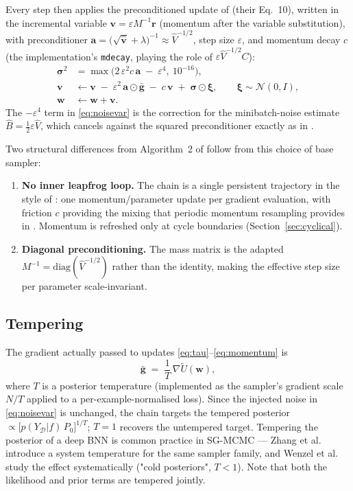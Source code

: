 \documentclass[11pt]{article}
\newcommand{\w}{\mathbf{w}}
\newcommand{\vv}{\mathbf{v}}
\newcommand{\D}{\mathcal{D}}
\newcommand{\N}{\mathcal{N}}
\newcommand{\gbar}{\bar{\mathbf{g}}}
\newcommand{\vhat}{\hat{\mathbf{v}}}
\newcommand{\gradU}{\nabla \widetilde{U}}
\begin{document}
Every step then applies the preconditioned update of
\cite{springenberg2016} (their Eq.~10), written in the incremental variable
$\vv = \varepsilon M^{-1}\mathbf{r}$ (momentum after the variable
substitution), with preconditioner
$\mathbf{a} = \bigl(\sqrt{\vhat} + \lambda\bigr)^{-1} \approx
\hat V^{-1/2}$, step size $\varepsilon$, and momentum decay
$c$ (the implementation's \texttt{mdecay}, playing the role of
$\varepsilon \hat V^{-1/2} C$):
\begin{align}
  \bm{\sigma}^{2} &= \max\bigl(2\,\varepsilon^{2} c\,\mathbf{a}
      \;-\; \varepsilon^{4},\ 10^{-16}\bigr),
      \label{eq:noisevar}\\
  \vv &\leftarrow \vv \;-\; \varepsilon^{2}\,\mathbf{a}\odot\gbar
      \;-\; c\,\vv \;+\; \bm{\sigma}\odot\bm{\xi},
      \qquad \bm{\xi}\sim\N(0,I),
      \label{eq:momentum}\\
  \w &\leftarrow \w + \vv.
  \label{eq:position}
\end{align}
The $-\varepsilon^4$ term in \eqref{eq:noisevar} is the correction for the
minibatch-noise estimate $\hat B = \tfrac{1}{2}\varepsilon\hat V$, which
cancels against the squared preconditioner exactly as in
\cite{springenberg2016}.

Two structural differences from Algorithm~2 of \cite{wu2025} follow from this
choice of base sampler:
\begin{enumerate}
  \item \textbf{No inner leapfrog loop.}  The chain is a single persistent
  trajectory in the style of \cite{chen2014}: one
  momentum/parameter update per gradient evaluation, with friction $c$
  providing the mixing that periodic momentum resampling provides in
  \cite{wu2025}.  Momentum is refreshed only at cycle boundaries
  (Section~\ref{sec:cyclical}).
  \item \textbf{Diagonal preconditioning.}  The mass matrix is the adapted
  $M^{-1} = \mathrm{diag}(\hat V^{-1/2})$ rather than the identity, making
  the effective step size per parameter scale-invariant.
\end{enumerate}

\subsection{Tempering}
\label{sec:tempering}

The gradient actually passed to updates
\eqref{eq:tau}--\eqref{eq:momentum} is
\begin{equation}
  \gbar \;=\; \frac{1}{T}\,\gradU(\w),
\end{equation}
where $T$ is a posterior temperature (implemented as the sampler's gradient
scale $N/T$ applied to a per-example-normalised loss).  Since the injected
noise in \eqref{eq:noisevar} is unchanged, the chain targets the tempered
posterior $\propto \bigl[p(Y_\D|f)\,P_0\bigr]^{1/T}$; $T=1$ recovers the
untempered target.  Tempering the posterior of a deep BNN is common practice
in SG-MCMC --- Zhang et al.~\cite{zhang2020} introduce a system temperature
for the same sampler family, and Wenzel et al.~\cite{wenzel2020} study the
effect systematically ("cold posteriors", $T<1$).  Note that both the
likelihood and prior terms are tempered jointly.
\end{document}
